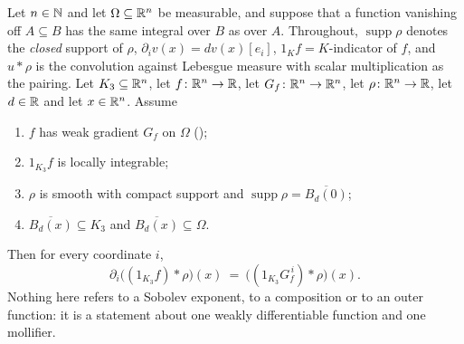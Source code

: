 \begin{helper}
Let $n\in\mathbb{N}$ and let $\Omega\subseteq\mathbb{R}^n$ be measurable, and suppose that a
function vanishing off $A\subseteq B$ has the same integral over $B$ as over
$A$.  Throughout, $\operatorname{supp}\rho$ denotes the \emph{closed} support
of $\rho$, $\partial_iv(x)=dv(x)[e_i]$, $1_Kf=K$-indicator of $f$, and
$u*\rho$ is the convolution against Lebesgue measure with scalar multiplication
as the pairing.  Let $K_3\subseteq\mathbb{R}^n$, let $f\colon\mathbb{R}^n\to\mathbb{R}$, let
$G_f\colon\mathbb{R}^n\to\mathbb{R}^n$, let $\rho\colon\mathbb{R}^n\to\mathbb{R}$, let $d\in\mathbb{R}$ and let
$x\in\mathbb{R}^n$.  Assume
\begin{enumerate}
\item[(H1)] $f$ has weak gradient $G_f$ on $\Omega$
  ();
\item[(H2)] $1_{K_3}f$ is locally integrable;
\item[(H3)] $\rho$ is smooth with compact support and
  $\operatorname{supp}\rho=\overline{B_d(0)}$;
\item[(H4)] $\overline{B_d(x)}\subseteq K_3$ and
  $\overline{B_d(x)}\subseteq\Omega$.
\end{enumerate}
Then for every coordinate $i$,
\[
\partial_i\bigl((1_{K_3}f)*\rho\bigr)(x)
\ =\ \bigl((1_{K_3}G_f^{\,i})*\rho\bigr)(x).
\]
Nothing here refers to a Sobolev exponent, to a composition or to an outer
function: it is a statement about one weakly differentiable function and one
mollifier.
\end{helper}

